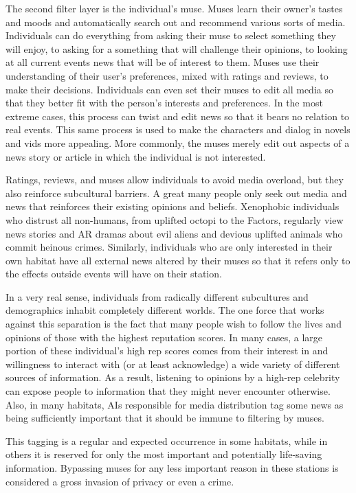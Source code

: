 The second filter layer is the individual's muse. Muses learn their owner's tastes and moods and automatically search out and recommend various sorts of media. Individuals can do everything from asking their muse to select something they will enjoy, to asking for a something that will challenge their opinions, to looking at all current events news that will be of interest to them. Muses use their understanding of their user's preferences, mixed with ratings and reviews, to make their decisions. Individuals can even set their muses to edit all media so that they better fit with the person's interests and preferences. In the most extreme cases, this process can twist and edit news so that it bears no relation to real events. This same process is used to make the characters and dialog in novels and vids more appealing. More commonly, the muses merely edit out aspects of a news story or article in which the individual is not interested. 

Ratings, reviews, and muses allow individuals to avoid media overload, but they also reinforce subcultural barriers. A great many people only seek out media and news that reinforces their existing opinions and beliefs. Xenophobic individuals who distrust all non-humans, from uplifted octopi to the Factors, regularly view news stories and AR dramas about evil aliens and devious uplifted animals who commit heinous crimes. Similarly, individuals who are only interested in their own habitat have all external news altered by their muses so that it refers only to the effects outside events will have on their station. 

In a very real sense, individuals from radically different subcultures and demographics inhabit completely different worlds. The one force that works against this separation is the fact that many people wish to follow the lives and opinions of those with the highest reputation scores. In many cases, a large portion of these individual's high rep scores comes from their interest in and willingness to interact with (or at least acknowledge) a wide variety of different sources of information. As a result, listening to opinions by a high-rep celebrity can expose people to information that they might never encounter otherwise. Also, in many habitats, AIs responsible for media distribution tag some news as being sufficiently important that it should be immune to filtering by muses. 

This tagging is a regular and expected occurrence in some habitats, while in others it is reserved for only the most important and potentially life-saving information. Bypassing muses for any less important reason in these stations is considered a gross invasion of privacy or even a crime. 

